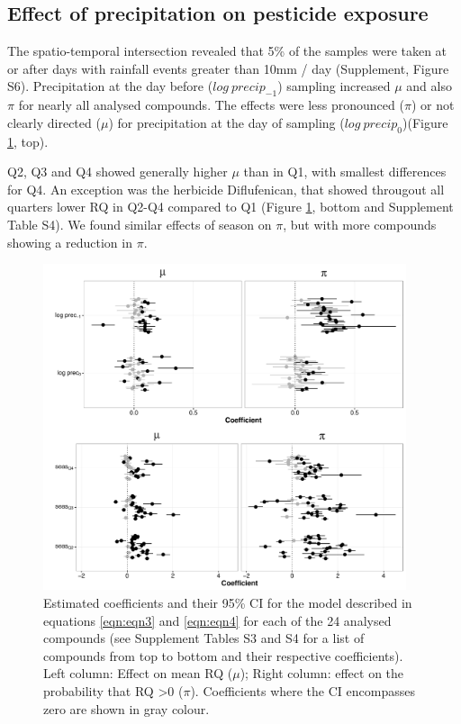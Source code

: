 \documentclass[journal=esthag,manuscript=article]{achemso}
\begin{document}
\subsection{Effect of precipitation on pesticide exposure}
The spatio-temporal intersection revealed that 5\% of the samples were taken at or after days with rainfall events greater than 10mm / day (Supplement, Figure S6).
Precipitation at the day before ($log~precip_{-1}$) sampling increased $\mu$ and also $\pi$ for nearly all analysed compounds. 
The effects were less pronounced ($\pi$) or not clearly directed ($\mu$) for precipitation at the day of sampling ($log~precip_{0}$)(Figure \ref{fig:fig5}, top).

Q2, Q3 and Q4 showed generally higher $\mu$ than in Q1, with smallest differences for Q4.
An exception was the herbicide Diflufenican, that showed througout all quarters lower RQ in Q2-Q4 compared to Q1 (Figure \ref{fig:fig5}, bottom and Supplement Table S4).
We found similar effects of season on $\pi$, but with more compounds showing a reduction in $\pi$.

\begin{figure}[ht]
  \includegraphics[width=0.95\textwidth]{figure5.pdf}
  \caption{Estimated coefficients and their 95\% CI for the model described in equations \ref{eqn:eqn3} and \ref{eqn:eqn4} for each of the 24 analysed compounds (see Supplement Tables S3 and S4 for a list of compounds from top to bottom and their respective coefficients). Left column: Effect on mean RQ ($\mu$); Right column: effect on the probability that RQ \textgreater 0 ($\pi$).
  Coefficients where the CI encompasses zero are shown in gray colour.
  }
  \label{fig:fig5}
\end{figure}
\end{document}
